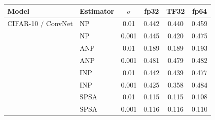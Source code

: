 \begin{tabular}{l l c ccc}
\toprule
Model & Estimator & $\sigma$ & fp32 & TF32 & fp64 \\
\midrule
CIFAR-10 / ConvNet & NP & 0.01 & 0.442 & 0.440 & 0.459 \\
 & NP & 0.001 & 0.445 & 0.420 & 0.475 \\
 & ANP & 0.01 & 0.189 & 0.189 & 0.193 \\
 & ANP & 0.001 & 0.481 & 0.479 & 0.482 \\
 & INP & 0.01 & 0.442 & 0.439 & 0.477 \\
 & INP & 0.001 & 0.425 & 0.358 & 0.484 \\
 & SPSA & 0.01 & 0.115 & 0.115 & 0.108 \\
 & SPSA & 0.001 & 0.116 & 0.116 & 0.110 \\
\bottomrule
\end{tabular}
